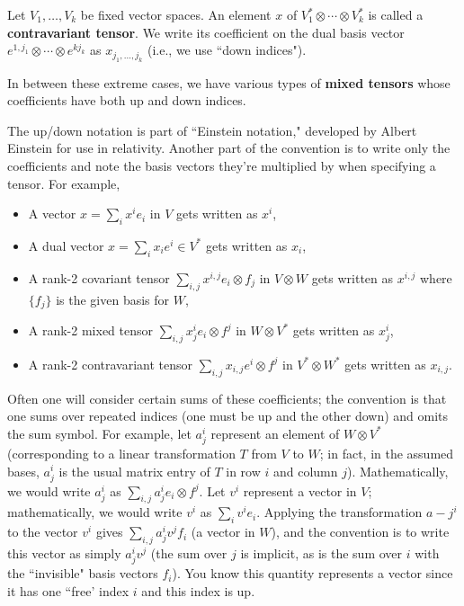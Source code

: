 \begin{definition}

Let \(V_1, \ldots, V_k\) be fixed vector spaces. An element \(x\) of \(V_1^* \otimes \cdots \otimes V_k^*\) is called a \textbf{contravariant tensor}. We write its coefficient on the dual basis vector \(e^{1, j_1} \otimes \cdots \otimes e^{k j_k}\) as \(x_{j_1 ,\ldots, j_k}\) (i.e., we use ``down indices").

\end{definition}

In between these extreme cases, we have various types of \textbf{mixed tensors} whose coefficients have both up and down indices. 

\begin{remark}\label{ra.remark.up.index}

The up/down notation is part of ``Einstein notation," developed by Albert Einstein for use in relativity. Another part of the convention is to write only the coefficients and note the basis vectors they're multiplied by when specifying a tensor. For example,

\begin{itemize}

\item A vector \(x = \sum_i x^i e_i\) in \(V\) gets written as \(x^i\),

\item A dual vector \(x = \sum_i x_i e^i \in V^*\) gets written as \(x_i\),

\item A rank-2 covariant tensor \(\sum_{i,j} x^{i,j} e_i \otimes f_j\) in \(V \otimes W\) gets written as \(x^{i,j}\) where \(\{f_j\}\) is the given basis for \(W\),

\item A rank-2 mixed tensor \(\sum_{i,j} x_j^i e_i \otimes f^j\) in \(W \otimes V^*\) gets written as \(x_j^i\),

\item A rank-2 contravariant tensor \(\sum_{i,j} x_{i,j} e^i \otimes f^j\) in \(V^* \otimes W^*\) gets written as \(x_{i,j}\).

\end{itemize}

Often one will consider certain sums of these coefficients; the convention is that one sums over repeated indices (one must be up and the other down) and omits the sum symbol. For example, let \(a_j^i\) represent an element of \(W \otimes V^*\) (corresponding to a linear transformation \(T\) from \(V\) to \(W\); in fact, in the assumed bases, \(a_j^i\) is the usual matrix entry of \(T\) in row \(i\) and column \(j\)). Mathematically, we would write \(a_j^i\) as \(\sum_{i,j} a_j^i e_i \otimes f^j\). Let \(v^i\) represent a vector in \(V\); mathematically, we would write \(v^i\) as \(\sum_i v^i e_i\). Applying the transformation \(a-j^i\) to the vector \(v^i\) gives \(\sum_{i,j}a_j^i v^j f_i\) (a vector in \(W\)), and the convention is to write this vector as simply \(a_j^i v^j\) (the sum over \(j\) is implicit, as is the sum over \(i\) with the ``invisible" basis vectors \(f_i\)). You know this quantity represents a vector since it has one ``free' index \(i\) and this index is up.


\end{remark}
